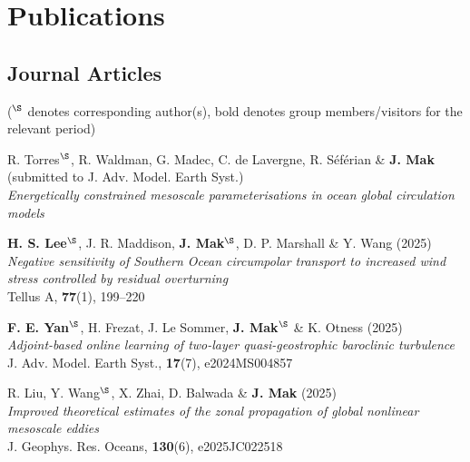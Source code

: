 \documentclass[letterpaper]{article}
\renewenvironment{itemize}{
  \begin{list}{}{
    \setlength{\leftmargin}{1.5em}
  }
}{
  \end{list}
}
\begin{document}
\section*{Publications}
\subsection*{Journal Articles}

(${}^\S$ denotes corresponding author(s), bold denotes group members/visitors for the relevant period)

\begin{itemize}


\item[*] R. Torres$^{\S}$, R. Waldman, G. Madec, C. de Lavergne, R. S\'ef\'erian \& \textbf{J. Mak} (submitted to J. Adv. Model. Earth Syst.)\\
\textit{Energetically constrained mesoscale parameterisations in ocean global circulation models}

\item[28.] \textbf{H. S. Lee}$^{\S}$, J. R. Maddison, \textbf{J. Mak}$^{\S}$, D. P. Marshall \& Y. Wang (2025)\\
\textit{Negative sensitivity of Southern Ocean circumpolar transport to increased wind stress controlled by residual overturning}\\
Tellus A, \textbf{77}(1), 199--220

\item[27.] \textbf{F. E. Yan}$^{\S}$, H. Frezat, J. Le Sommer, \textbf{J. Mak}$^{\S}$ \& K. Otness (2025)\\
\textit{Adjoint-based online learning of two-layer quasi-geostrophic baroclinic turbulence}\\
J. Adv. Model. Earth Syst., \textbf{17}(7), e2024MS004857

\item[26.] R. Liu, Y. Wang$^{\S}$, X. Zhai, D. Balwada \& \textbf{J. Mak} (2025)\\
\textit{Improved theoretical estimates of the zonal propagation of global nonlinear mesoscale eddies}\\
J. Geophys. Res. Oceans, \textbf{130}(6), e2025JC022518


\end{itemize}
\end{document}
